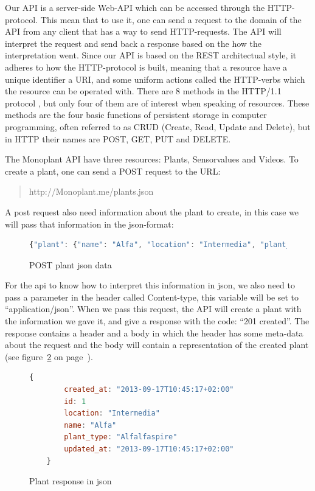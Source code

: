 Our API is a server-side Web-API which can be accessed through the HTTP-protocol. This mean that to use it, one can send a request to the domain of the API from any client that has a way to send HTTP-requests. The API will interpret the request and send back a response based on the how the interpretation went. Since our API is based on the REST architectual style, it adheres to how the HTTP-protocol is built, meaning that a resource have a unique identifier a URI, and some uniform actions called the HTTP-verbs which the resource can be operated with. There are 8 methods in the HTTP/1.1 protocol \citep[p.36]{fielding1999hypertext}, but only four of them are of interest when speaking of resources. These methods are the four basic functions of persistent storage in computer programming, often referred to as CRUD (Create, Read, Update and Delete), but in HTTP their names are POST, GET, PUT and DELETE. 

The Monoplant API have three resources: Plants, Sensorvalues and Videos. To create a plant, one can send a POST request to the URL:

\begin{quote}
http://Monoplant.me/plants.json 
\end{quote}

A post request also need information about the plant to create, in this case we will pass that information in the json-format:

\begin{figure}
	\begin{lstlisting}[language=javascript]
	 {"plant": {"name": "Alfa", "location": "Intermedia", "plant_type": "Alfalfaspire"}} 
	\end{lstlisting}
	\caption{POST plant json data}
	\label{fig:postdata}
\end{figure}

For the api to know how to interpret this information in json, we also need to pass a parameter in the header called Content-type, this variable will be set to “application/json”. When we pass this request, the API will create a plant with the information we gave it, and give a response with the code: “201 created”. The response contains a header and a body in which the header has some meta-data about the request and the body will contain a representation of the created plant (see figure~\ref{fig:plantresponse} on page~\pageref{fig:plantresponse}).

\begin{figure}
	\begin{lstlisting}[language=javascript]
	{
		created_at: "2013-09-17T10:45:17+02:00"
		id: 1
		location: "Intermedia"
		name: "Alfa"
		plant_type: "Alfalfaspire"
		updated_at: "2013-09-17T10:45:17+02:00"
	}
	\end{lstlisting}
	\caption{Plant response in json}
	\label{fig:plantresponse}
\end{figure}


